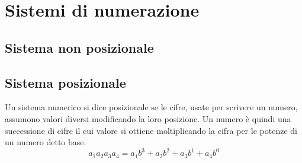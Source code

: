 \chapter{Sistemi di numerazione}
\label{cha:Sistemi di numerazione}
\minitoc
\mtcskip                                %
\minilof                                %
\mtcskip                                %
\minilot
\section{Sistema non posizionale}
\label{sec:sistemanonposizionale}

\section{Sistema posizionale} 
\label{sec:sistemaposizionale}
Un sistema numerico si dice posizionale se le cifre, usate per scrivere un numero, assumono valori diversi modificando la loro posizione.
Un numero è quindi una successione di cifre il cui valore si ottiene moltiplicando la cifra per le potenze di un numero detto base. \[a_1a_2a_3a_4=a_1b^3+a_2b^2+a_3b^1+a_4b^0\] 
